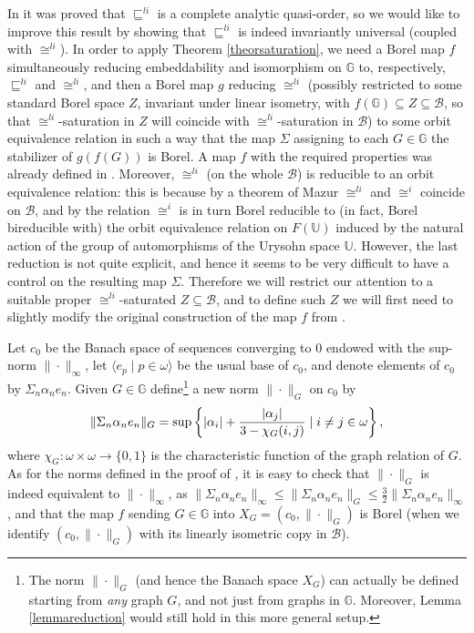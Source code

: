 \documentclass{amsart}
\theoremstyle{definition}
\theoremstyle{remark}
\begin{document}
In \cite{louros}
it was proved that $\sqsubseteq^{li}$ is a complete  analytic
quasi-order, so we would like to improve this result by showing that
$\sqsubseteq^{li}$ is indeed invariantly universal (coupled with
$\cong^{li}$).  In
order to apply
Theorem \ref{theorsaturation}, we need a Borel map $f$ simultaneously
reducing embeddability and isomorphism
on ${\mathbb{G}}$ to, respectively,  $\sqsubseteq^{li}$ and $\cong^{li}$, and
then a Borel
map $g$ reducing $\cong^{li}$ (possibly restricted to some standard
Borel space $Z$, invariant under linear isometry, with $f({\mathbb{G}}) \subseteq Z \subseteq
\mathcal{B}$, so that
$\cong^{li}$-saturation in $Z$ will coincide with
$\cong^{li}$-saturation in $\mathcal{B}$)  to some orbit equivalence
relation in such a way that the map $\Sigma$ assigning to each $G \in {\mathbb{G}}$ the
stabilizer of $g(f(G))$ is Borel. A map $f$ with the required properties
was
already defined in \cite[Theorem 4.6]{louros}. Moreover, $\cong^{li}$
(on the whole $\mathcal{B}$)
is reducible to an orbit equivalence relation: this is because by a
theorem of Mazur $\cong^{li}$ and $\cong^i$ coincide on
$\mathcal{B}$, and by \cite{gaokechris} the relation $\cong^i$ is in
turn Borel reducible to
(in fact, Borel bireducible with)
the orbit
equivalence relation on $F(\mathbb{U})$ induced by the natural action
of the group of
automorphisms of the Urysohn space $\mathbb{U}$. However, the last
reduction is not quite explicit, and hence it seems to be  very
difficult to have a control on the resulting map $\Sigma$. Therefore
we will restrict our attention to a suitable proper
$\cong^{li}$-saturated
$Z \subseteq \mathcal{B}$, and to define such $Z$ we will first need
to slightly modify the
original construction of the map $f$ from \cite{louros}.

Let $c_0$ be the Banach space of sequences converging to $0$ endowed
with the sup-norm $\| \cdot \|_\infty$, let $\langle e_p \mid p \in
\omega \rangle$ be the usual base of $c_0$, and denote elements of
$c_0$ by $\Sigma_n \alpha_n e_n$. Given $G \in {\mathbb{G}}$ define\footnote{The
norm $\| \cdot \|_G$ (and hence the Banach space $X_G$) can actually be
defined starting from \emph{any} graph $G$, and not just from graphs
in ${\mathbb{G}}$. Moreover,
Lemma \ref{lemmareduction} would still hold in this more general
setup.} a new norm
$\| \cdot \|_G$ on $c_0$ by
\[ \| \Sigma_n \alpha_n e_n \|_G = {\rm sup} \left\{ |\alpha_i| +
\frac{|\alpha_j|}{3 - \chi_G(i,j)} \mid i \neq j \in \omega \right \}, \]
where $\chi_G \colon \omega \times \omega \to \{ 0,1 \}$ is the
characteristic function of the graph relation of
$G$. As for the norms defined in the proof of \cite[Theorem
4.6]{louros}, it is easy to check that $\| \cdot \|_G$ is indeed
equivalent to $\| \cdot \|_\infty$, as $\| \Sigma_n \alpha_n e_n
\|_\infty \leq \| \Sigma_n \alpha_n e_n \|_G \leq \frac{3}{2} \|
\Sigma_n \alpha_n e_n
\|_\infty$, and that the map $f$ sending $G \in {\mathbb{G}}$ into $X_G = (c_0,
\| \cdot \|_G)$ is
Borel (when we identify $(c_0, \| \cdot \|_G)$ with its linearly
isometric copy in $\mathcal{B}$).
\end{document}
